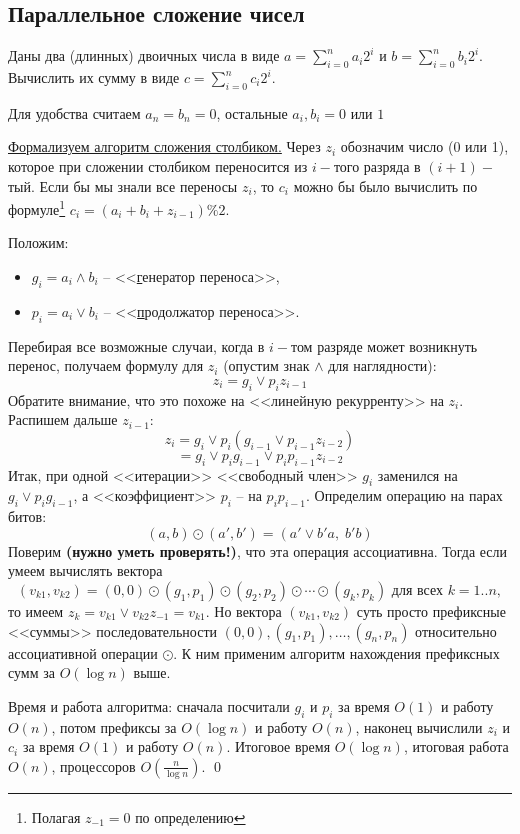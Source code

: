 \subsection{Параллельное сложение чисел}
\begin{problem*}Даны два (длинных) двоичных числа в виде $a = \sum_{i=0}^n a_i2^i$ и $b = \sum_{i=0}^n b_i2^i$. Вычислить их сумму в виде $c = \sum_{i=0}^n c_i2^i$.
\end{problem*}

 Для удобства считаем $a_n = b_n = 0$, остальные $a_i, b_i = 0\text{ или }1$

\underline{Формализуем алгоритм сложения столбиком.} Через $z_i$ обозначим число (0 или 1), которое при сложении столбиком переносится из $i-$того разряда в $(i+1)-$тый. Если бы мы знали все переносы $z_i$, то $c_i$ можно бы было вычислить по формуле\footnote{Полагая $z_{-1}=0$ по определению} $c_i = (a_i+b_i+z_{i-1})\%2$.

Положим:
\begin{itemize}
\item $g_i = a_i \land b_i$ -- <<\underline{г}енератор переноса>>,
\item $p_i = a_i \lor b_i$ -- <<\underline{п}родолжатор переноса>>.
\end{itemize}
Перебирая все возможные случаи, когда в $i-$том разряде может возникнуть перенос, получаем формулу для $z_i$ (опустим знак $\land$ для наглядности):
$$z_i = g_i \lor p_i z_{i-1}$$
Обратите внимание, что это похоже на <<линейную рекурренту>> на $z_i$. Распишем дальше $z_{i-1}$:
$$z_i = g_i \lor p_i(g_{i-1} \lor p_{i-1} z_{i-2})$$ $$ =g_i \lor p_i g_{i-1} \lor p_i p_{i-1} z_{i-2}$$
Итак, при одной <<итерации>> <<свободный член>> $g_i$ заменился на $g_i \lor p_i g_{i-1}$, а <<коэффициент>> $p_i$ -- на $p_i p_{i-1}$.
Определим операцию на парах битов: $$(a,b) \odot (a', b') = (a' \lor b' a, \;b' b)$$
Поверим \textbf{(нужно уметь проверять!)}, что эта операция ассоциативна.
Тогда если умеем вычислять вектора $$(v_{k1}, v_{k2}) = (0, 0)\odot (g_1, p_1)\odot (g_2, p_2)\odot \cdots \odot (g_k, p_k) \text{ для всех } k=1..n,$$ то имеем $z_k = v_{k1} \lor v_{k2}z_{-1} = v_{k1}$. Но вектора $(v_{k1}, v_{k2})$ суть просто префиксные <<суммы>> последовательности $(0, 0), (g_1, p_1), \ldots, (g_n, p_n)$ относительно ассоциативной операции $\odot$. К ним применим алгоритм нахождения префиксных сумм за $O(\log n)$ выше.

Время и работа алгоритма: сначала посчитали $g_i$ и $p_i$ за время $O(1)$ и работу $O(n)$, потом префиксы за $O(\log n)$ и работу $O(n)$, наконец вычислили $z_i$ и $c_i$ за время $O(1)$  и работу $O(n)$. Итоговое время $O(\log n)$, итоговая работа $O(n)$, процессоров $O(\frac{n}{\log n})$. \qed


